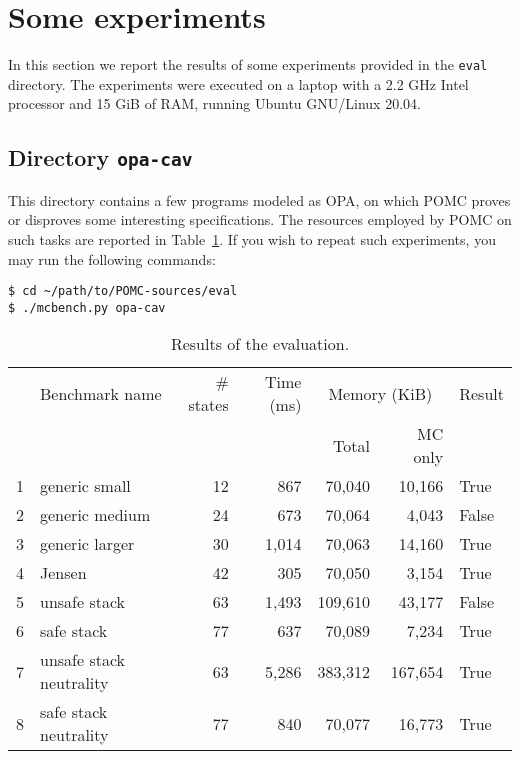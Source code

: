 \documentclass[9pt,a4paper]{article}
\begin{document}
\section{Some experiments}
\label{sec:exp}

In this section we report the results of some experiments
provided in the \texttt{eval} directory.
The experiments were executed on a laptop with a 2.2 GHz Intel processor
and 15 GiB of RAM, running Ubuntu GNU/Linux 20.04.


\subsection{Directory \texttt{opa-cav}}
\label{sec:exp-opa}

This directory contains a few programs modeled as OPA,
on which POMC proves or disproves some interesting specifications.
The resources employed by POMC on such tasks are reported in Table~\ref{tab:eval}.
If you wish to repeat such experiments, you may run the following
commands:
\begin{verbatim}
$ cd ~/path/to/POMC-sources/eval
$ ./mcbench.py opa-cav
\end{verbatim}

\begin{table}
  \centering
  \begin{tabular}{| r | l | r | r | r | r | l |}
    \hline
    & Benchmark name & \# states & Time (ms) & \multicolumn{2}{c|}{Memory (KiB)} & Result \\
    \cline{5-6}
    & & & & Total & MC only & \\
    \hline
    1 & generic small & 12 & 867 & 70,040 & 10,166 & True \\
    2 & generic medium & 24 & 673 & 70,064 & 4,043 & False \\
    3 & generic larger & 30 & 1,014 & 70,063 & 14,160 & True \\
    4 & Jensen & 42 & 305 & 70,050 & 3,154 & True \\
    5 & unsafe stack & 63 & 1,493 & 109,610 & 43,177 & False \\
    6 & safe stack & 77 & 637 & 70,089 & 7,234 & True \\
    7 & unsafe stack neutrality & 63 & 5,286 & 383,312 & 167,654 & True \\
    8 & safe stack neutrality & 77 & 840 & 70,077 & 16,773 & True \\
    \hline
  \end{tabular}
  \caption{Results of the evaluation.}
  \label{tab:eval}
\end{table}
\end{document}
